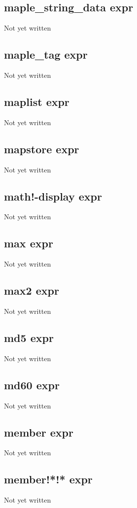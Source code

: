 \documentclass[a4paper,11pt]{article}
\begin{document}
\subsection{\ttfamily maple\_string\_data expr}
Not yet written

\subsection{\ttfamily maple\_tag expr}
Not yet written

\subsection{\ttfamily maplist expr}
Not yet written

\subsection{\ttfamily mapstore expr}
Not yet written

\subsection{\ttfamily math!-display expr}
Not yet written

\subsection{\ttfamily max expr}
Not yet written

\subsection{\ttfamily max2 expr}
Not yet written

\subsection{\ttfamily md5 expr}
Not yet written

\subsection{\ttfamily md60 expr}
Not yet written

\subsection{\ttfamily member expr}
Not yet written

\subsection{\ttfamily member!*!* expr}
Not yet written
\end{document}
